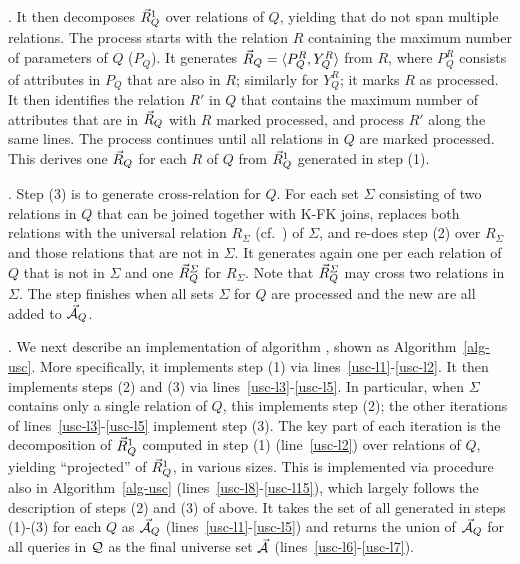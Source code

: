 {. It then decomposes $\vec{R}_{Q}^{1}$ over relations of
$Q$, yielding \bss that do not span multiple relations. The
process starts with the relation $R$ containing the maximum
number of parameters of $Q$ (\ie $P_{Q}$). It generates
$\vec{R}_{Q} = \langle P_{Q}^{R},\allowbreak Y_{Q}^{R}\rangle$ from $R$, where
$P_{Q}^{R}$ consists of attributes in $P_{Q}$ that are also in
$R$; similarly for $Y_{Q}^{R}$; it marks $R$ as processed.
It then identifies the relation $R'$ in $Q$ that contains the maximum
number of attributes that are in \bss $\vec{R}_{Q}$ with $R$
marked processed, and process $R'$ along the same lines. The
process continues until all relations in $Q$ are marked
processed. This derives one \bs $\vec{R}_{Q}$ for each $R$ of $Q$
from $\vec{R}_{Q}^{1}$ generated in step (1).



. Step (3) is to generate cross-relation \bss
for $Q$. For each set $\Sigma$ consisting of two relations in $Q$
that can be joined together with K-FK joins, \usc replaces both
relations with the universal relation $R_{\Sigma}$
(cf.~\cite{AbHuVi1995}) of $\Sigma$, and re-does step (2) over
$R_{\Sigma}$ and those relations that are not in $\Sigma$. It
generates again one \bs per each relation of $Q$ that is not in
$\Sigma$ and one \bs $\vec{R}_{Q}^{\Sigma}$ for $R_{\Sigma}$. Note
that $\vec{R}_{Q}^{\Sigma}$ may cross two relations in $\Sigma$.
The step finishes when all sets $\Sigma$ for $Q$ are processed
and the new \bss are all added to $\vec{{\mathcal A}}_{Q}$. 



.
We next describe an implementation of algorithm \usc, shown as
Algorithm~\ref{alg-usc}. More specifically, it implements step
(1) via lines~\ref{usc-l1}-\ref{usc-l2}.
It then implements steps (2) and (3) via 
lines~\ref{usc-l3}-\ref{usc-l5}. In particular, when $\Sigma$
contains only a single relation of $Q$, this implements step (2);
the other iterations of lines~\ref{usc-l3}-\ref{usc-l5} implement
step (3). The key part of each iteration is the decomposition of
$\vec{R}_{Q}^{1}$ computed in step (1) (line~\ref{usc-l2}) over
relations of $Q$, yielding ``projected'' \bss of
$\vec{R}_{Q}^{1}$, in various sizes. This is implemented via
procedure \decompose also in Algorithm~\ref{alg-usc} (lines~\ref{usc-l8}-\ref{usc-l15}), which
largely follows the description of steps (2) and (3) of above.
It takes the set of all \bss generated in steps (1)-(3) for
each $Q$ as $\vec{{\mathcal A}}_{Q}$ (lines~\ref{usc-l1}-\ref{usc-l5}) and
returns the union of $\vec{{\mathcal A}}_{Q}$ for all queries in $\mathcal Q$ as the
final universe set $\vec{{\mathcal A}}$ (lines~\ref{usc-l6}-\ref{usc-l7}).

}
